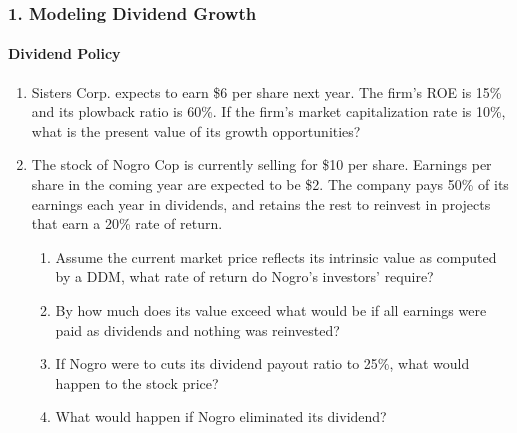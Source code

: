 \documentclass{beamer}
\begin{document}
\begin{practiceframe}[t]
\frametitle{1. Modeling Dividend Growth}
\framesubtitle{Dividend Policy}

    \begin{enumerate}
        \item Sisters Corp. expects to earn \$6 per share next year.  The firm's 
        ROE is 15\% and its plowback ratio is 60\%.   If the firm's market capitalization rate is 10\%, what is the present value of its growth opportunities?
        \item The stock of Nogro Cop is currently selling for \$10 per share.   Earnings per share in the coming year are expected to be \$2.   The company pays 50\% of its earnings each year in dividends, and retains the rest to reinvest in projects that earn a 20\% rate of return. 
        \begin{enumerate}
        \footnotesize
        \item[a. ] Assume the current market price reflects its intrinsic value as computed by a DDM, what rate of return do Nogro's investors' require?
        \item[b. ] By how much does its value exceed what would be if all earnings were paid as dividends and nothing was reinvested?
        \item[c. ]If Nogro were to cuts its dividend payout ratio to 25\%, what would happen to the stock price?
        \item[d. ] What would happen if Nogro eliminated its dividend?
        \end{enumerate}
    \end{enumerate}

\end{practiceframe}
\end{document}
